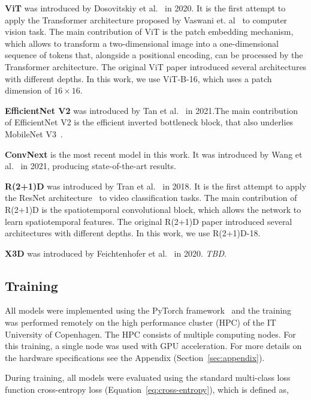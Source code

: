 \documentclass[a4paper]{article}
\begin{document}
  \textbf{ViT} was introduced by Dosovitskiy et al.~\cite{vit} in 2020. It is
  the first attempt to apply the Transformer architecture proposed by Vaswani
  et. al~\cite{transformer} to computer vision task. The main contribution of
  ViT is the patch embedding mechanism, which allows to transform a
  two-dimensional image into a one-dimensional sequence of tokens that,
  alongside a positional encoding, can be processed by the Transformer
  architecture. The original ViT paper introduced several architectures with
  different depths. In this work, we use ViT-B-16, which uses a patch dimension
  of $16 \times 16$.

  \textbf{EfficientNet V2} was introduced by Tan et al.~\cite{efficientnetv2} in
  2021.The main contribution of EfficientNet V2 is the efficient inverted
  bottleneck block, that also underlies MobileNet V3~\cite{mobilenetv3}.

  \textbf{ConvNext} is the most recent model in this work. It was introduced by
  Wang et al.~\cite{convnext} in 2021, producing state-of-the-art results.

  \textbf{R(2+1)D} was introduced by Tran et al.~\cite{r2plus1d} in 2018. It is
  the first attempt to apply the ResNet architecture~\cite{resnet} to video
  classification tasks. The main contribution of R(2+1)D is the spatiotemporal
  convolutional block, which allows the network to learn spatiotemporal
  features. The original R(2+1)D paper introduced several architectures with
  different depths. In this work, we use R(2+1)D-18.

  \textbf{X3D} was introduced by Feichtenhofer et al.~\cite{x3d} in 2020.
  \textit{TBD}.


  \subsection{Training} %
  \label{sub:training}

  All models were implemented using the PyTorch framework~\cite{pytorch} and the
  training was performed remotely on the high performance cluster (HPC) of the
  IT University of Copenhagen. The HPC consists of multiple computing nodes. For
  this training, a single node was used with GPU acceleration. For more details
  on the hardware specifications see the Appendix (Section~\ref{sec:appendix}).

  During training, all models were evaluated using the standard multi-class loss
  function cross-entropy loss (Equation~\ref{eq:cross-entropy}), which is
  defined as,
\end{document}
